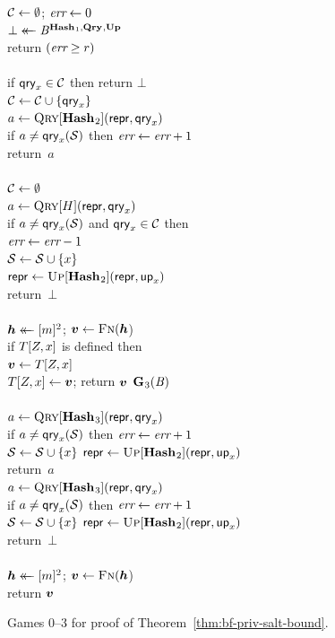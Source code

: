 \begin{figure}
{      $\mathcal{C} \gets \emptyset$;
      $\textit{err} \gets 0$\\
      $\bot \mathrel{\leftarrow\mkern-14mu\leftarrow} \mathit{B}^{\mathbf{Hash}\hspace{0.5pt}_1,\mathbf{Qry}\hspace{0.5pt},\mathbf{Up}\hspace{0.5pt}}$\\
      return $(\textit{err} \geq r)$
    \\[6pt]
    \\[2pt]
      if $\mathsf{qry}_x \in \mathcal{C}$ then return $\bot$\\
      $\mathcal{C} \gets \mathcal{C} \cup \{\mathsf{qry}_x\}$\\
      $a \gets \textsc{Qry}[\mathbf{Hash}\hspace{0.5pt}_2](\mathsf{repr}, \mathsf{qry}_x)$\\
      if $a \neq \mathsf{qry}_x(\mathcal{S})$ then $\textit{err} \gets \textit{err} + 1$\\
      return~$a$
    \\[6pt]
    \\[2pt]
      $\mathcal{C} \gets \emptyset$\\
      $a \gets \textsc{Qry}[H](\mathsf{repr}, \mathsf{qry}_x)$\\
      if $a \neq \mathsf{qry}_x(\mathcal{S})$ and $\mathsf{qry}_x \in \mathcal{C}$ then\\
      \tab $\textit{err} \gets \textit{err}-1$\\
      $\mathcal{S} \gets \mathcal{S} \cup \{x\}$\\
      $\mathsf{repr} \gets \textsc{Up}[\mathbf{Hash}\hspace{0.5pt}_2](\mathsf{repr},\mathsf{up}_x)$\\
      return~$\bot$
    \\[6pt]
    \\[2pt]
      $\hh \getsr [m]^2$; $\vv \gets \fff(\hh$)\\
      if $T[Z,x]$ is defined then\\
      \tab $\vv \gets T[\salt,x]$\\
      $T[\salt,x] \gets \vv$;
      return $\vv$
  }
  {
    \underline{$\mathbf{G}\hspace{0.5pt}_3(\mathit{B})$}\\[2pt]
    \\[2pt]
      $a \gets \textsc{Qry}[\mathbf{Hash}\hspace{0.5pt}_3](\mathsf{repr}, \mathsf{qry}_x)$\\
      if $a \neq \mathsf{qry}_x(\mathcal{S})$ then $\textit{err} \gets \textit{err} + 1$\\
      $\mathcal{S} \gets \mathcal{S} \cup \{x\}$
      $\mathsf{repr} \gets \textsc{Up}[\mathbf{Hash}\hspace{0.5pt}_2](\mathsf{repr},\mathsf{up}_x)$\\
      return~$a$
  }
  {
    \\[2pt]
      $a \gets \textsc{Qry}[\mathbf{Hash}\hspace{0.5pt}_3](\mathsf{repr}, \mathsf{qry}_x)$\\
      if $a \neq \mathsf{qry}_x(\mathcal{S})$ then $\textit{err} \gets \textit{err} + 1$\\
      $\mathcal{S} \gets \mathcal{S} \cup \{x\}$
      $\mathsf{repr} \gets \textsc{Up}[\mathbf{Hash}\hspace{0.5pt}_2](\mathsf{repr},\mathsf{up}_x)$\\
      return~$\bot$
    \\[6pt]
    \\[2pt]
      $\hh \getsr [m]^2$; $\vv \gets \fff(\hh$)\\
      return $\vv$
  }
  \caption{Games 0--3 for proof of Theorem~\ref{thm:bf-priv-salt-bound}.}
  \label{fig:bf-priv-salt-bound}
\end{figure}

